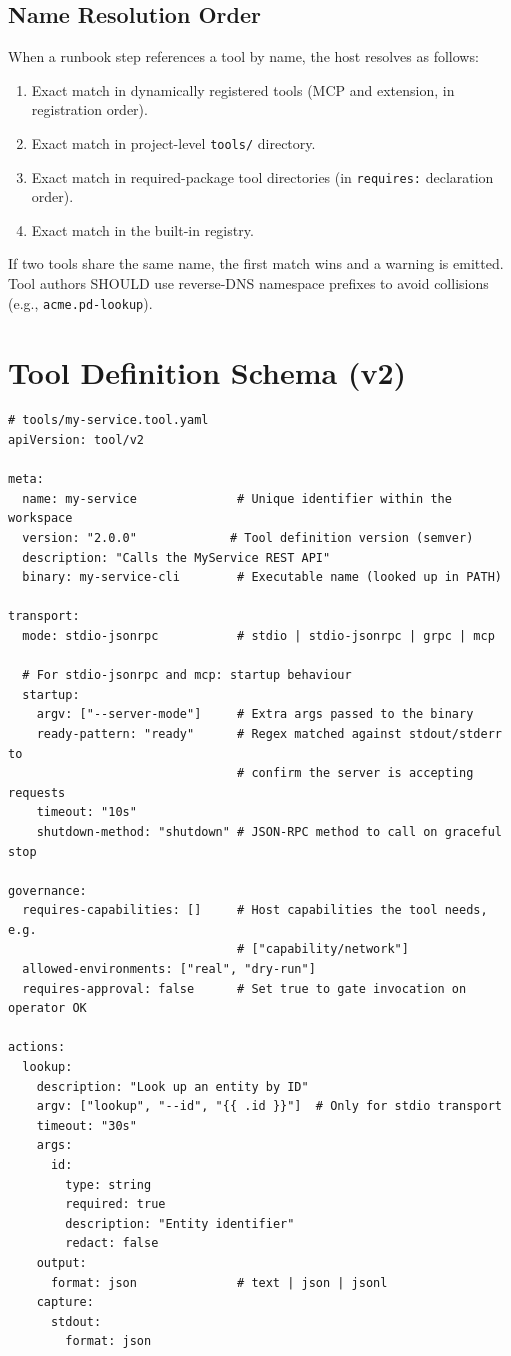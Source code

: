 \subsection{Name Resolution Order}

When a runbook step references a tool by name, the host resolves as follows:

\begin{enumerate}
  \item Exact match in dynamically registered tools (MCP and extension, in
        registration order).
  \item Exact match in project-level \texttt{tools/} directory.
  \item Exact match in required-package tool directories (in
        \texttt{requires:} declaration order).
  \item Exact match in the built-in registry.
\end{enumerate}

If two tools share the same name, the first match wins and a warning is
emitted.  Tool authors SHOULD use reverse-DNS namespace prefixes to avoid
collisions (e.g., \texttt{acme.pd-lookup}).

\section{Tool Definition Schema (v2)}
\label{sec:tool-definition-schema}

\begin{verbatim}
# tools/my-service.tool.yaml
apiVersion: tool/v2

meta:
  name: my-service              # Unique identifier within the workspace
  version: "2.0.0"             # Tool definition version (semver)
  description: "Calls the MyService REST API"
  binary: my-service-cli        # Executable name (looked up in PATH)

transport:
  mode: stdio-jsonrpc           # stdio | stdio-jsonrpc | grpc | mcp

  # For stdio-jsonrpc and mcp: startup behaviour
  startup:
    argv: ["--server-mode"]     # Extra args passed to the binary
    ready-pattern: "ready"      # Regex matched against stdout/stderr to
                                # confirm the server is accepting requests
    timeout: "10s"
    shutdown-method: "shutdown" # JSON-RPC method to call on graceful stop

governance:
  requires-capabilities: []     # Host capabilities the tool needs, e.g.
                                # ["capability/network"]
  allowed-environments: ["real", "dry-run"]
  requires-approval: false      # Set true to gate invocation on operator OK

actions:
  lookup:
    description: "Look up an entity by ID"
    argv: ["lookup", "--id", "{{ .id }}"]  # Only for stdio transport
    timeout: "30s"
    args:
      id:
        type: string
        required: true
        description: "Entity identifier"
        redact: false
    output:
      format: json              # text | json | jsonl
    capture:
      stdout:
        format: json
\end{verbatim}

